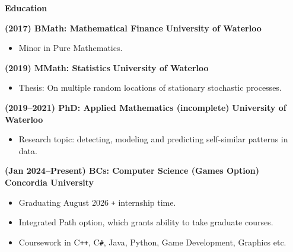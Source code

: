 \documentclass[11pt, oneside]{article}   	%
\begin{document}
\textbf{\large{Education}}

\small

\vspace{4pt}

\textbf{(2017) BMath: Mathematical Finance} \hfill \textbf{University of Waterloo}

\vspace{-6.5pt}
\begin{itemize}
\item Minor in Pure Mathematics.
\end{itemize}

\vspace{-4pt}

\textbf{(2019) MMath: Statistics} \hfill \textbf{University of Waterloo}

\vspace{-6pt}
\begin{itemize}
\item Thesis: On multiple random locations of stationary stochastic processes.
\end{itemize}

\vspace{-4pt}

\textbf{(2019--2021) PhD: Applied Mathematics (incomplete)} \hfill \textbf{University of Waterloo}

\vspace{-6pt}
\begin{itemize}
\item Research topic: detecting, modeling and predicting self-similar patterns in data.
\end{itemize}

\vspace{-4pt}

\textbf{(Jan 2024--Present) BCs: Computer Science (Games Option)} \hfill \textbf{Concordia University}

\vspace{-6pt}
\begin{itemize}
\item Graduating August 2026 \texttt{+} internship time.
\vspace{-4pt}
\item Integrated Path option, which grants ability to take graduate courses.
\vspace{-4pt}
\item Coursework in C\texttt{++}, C\texttt{\#}, Java, Python, Game Development, Graphics etc.
\end{itemize}
\end{document}
